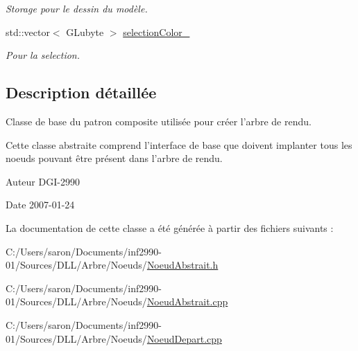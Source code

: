 \begin{DoxyCompactItemize}
\begin{DoxyCompactList}\small\item\em Storage pour le dessin du modèle. \end{DoxyCompactList}\item 
\hypertarget{class_noeud_abstrait_a6f09765538eef0d1db136f200a14dae8}{std\-::vector$<$ G\-Lubyte $>$ \hyperlink{class_noeud_abstrait_a6f09765538eef0d1db136f200a14dae8}{selection\-Color\-\_\-}}\label{class_noeud_abstrait_a6f09765538eef0d1db136f200a14dae8}

\begin{DoxyCompactList}\small\item\em Pour la selection. \end{DoxyCompactList}\end{DoxyCompactItemize}


\subsection{Description détaillée}
Classe de base du patron composite utilisée pour créer l'arbre de rendu. 

Cette classe abstraite comprend l'interface de base que doivent implanter tous les noeuds pouvant être présent dans l'arbre de rendu.

\begin{DoxyAuthor}{Auteur}
D\-G\-I-\/2990 
\end{DoxyAuthor}
\begin{DoxyDate}{Date}
2007-\/01-\/24 
\end{DoxyDate}


La documentation de cette classe a été générée à partir des fichiers suivants \-:\begin{DoxyCompactItemize}
\item 
C\-:/\-Users/saron/\-Documents/inf2990-\/01/\-Sources/\-D\-L\-L/\-Arbre/\-Noeuds/\hyperlink{_noeud_abstrait_8h}{Noeud\-Abstrait.\-h}\item 
C\-:/\-Users/saron/\-Documents/inf2990-\/01/\-Sources/\-D\-L\-L/\-Arbre/\-Noeuds/\hyperlink{_noeud_abstrait_8cpp}{Noeud\-Abstrait.\-cpp}\item 
C\-:/\-Users/saron/\-Documents/inf2990-\/01/\-Sources/\-D\-L\-L/\-Arbre/\-Noeuds/\hyperlink{_noeud_depart_8cpp}{Noeud\-Depart.\-cpp}\end{DoxyCompactItemize}
